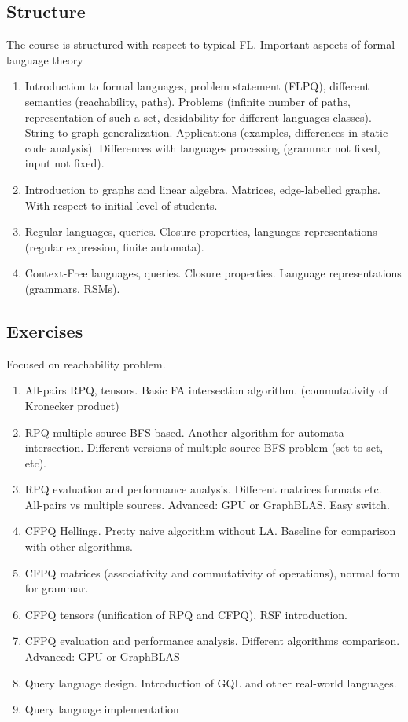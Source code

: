 \documentclass[sigconf]{acmart}
\begin{document}
\subsection{Structure}
The course is structured with respect to typical FL. Important aspects of formal language theory  
\begin{enumerate}
  \item Introduction to formal languages, problem statement (FLPQ), different semantics (reachability, paths). Problems (infinite number of paths, representation of such a set, desidability for different languages classes). String to graph generalization. Applications (examples, differences in static code analysis). Differences with languages processing (grammar not fixed, input not fixed).
  \item Introduction to graphs and linear algebra. Matrices, edge-labelled graphs. With respect to initial level of students.
  \item Regular languages, queries. Closure properties, languages representations (regular expression, finite automata).
  \item Context-Free languages, queries. Closure properties. Language representations (grammars, RSMs).
\end{enumerate}

\subsection{Exercises}
 Focused on reachability problem. 
\begin{enumerate}
  \item All-pairs RPQ, tensors. Basic FA intersection algorithm. (commutativity of Kronecker product)
  \item RPQ multiple-source BFS-based. Another algorithm for automata intersection. Different versions of multiple-source BFS problem (set-to-set, etc).  
  \item RPQ evaluation and performance analysis. Different matrices formats etc. All-pairs vs multiple sources. Advanced: GPU or GraphBLAS. Easy switch.
  \item CFPQ Hellings. Pretty naive algorithm without LA. Baseline for comparison with other algorithms.
  \item CFPQ matrices (associativity and commutativity of operations), normal form for grammar.
  \item CFPQ tensors (unification of RPQ and CFPQ), RSF introduction.
  \item CFPQ evaluation and performance analysis. Different algorithms comparison. Advanced: GPU or GraphBLAS 
  \item Query language design. Introduction of GQL and other real-world languages. 
  \item Query language implementation
\end{enumerate}
\end{document}
